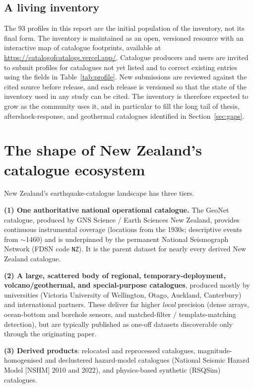 \documentclass[10pt,a4paper]{article}
\newcommand{\inventoryurl}{https://catalogofcatalogs.vercel.app/}
\begin{document}
\subsection{A living inventory}\label{sec:living}
The 93 profiles in this report are the initial population of the inventory, not its final form. The inventory is maintained as an open, versioned resource with an interactive map of catalogue footprints, available at \url{\inventoryurl}. Catalogue producers and users are invited to submit profiles for catalogues not yet listed and to correct existing entries using the fields in Table~\ref{tab:profile}. New submissions are reviewed against the cited source before release, and each release is versioned so that the state of the inventory used in any study can be cited. The inventory is therefore expected to grow as the community uses it, and in particular to fill the long tail of thesis, aftershock-response, and geothermal catalogues identified in Section~\ref{sec:gaps}.

\section{The shape of New Zealand's catalogue ecosystem}\label{sec:overview}
New Zealand's earthquake-catalogue landscape has three tiers.

\textbf{(1) One authoritative national operational catalogue.} The GeoNet catalogue, produced by GNS Science / Earth Sciences New Zealand, provides continuous instrumental coverage (locations from the 1930s; descriptive events from $\sim$1460) and is underpinned by the permanent National Seismograph Network (FDSN code \texttt{NZ}). It is the parent dataset for nearly every derived New Zealand catalogue.

\textbf{(2) A large, scattered body of regional, temporary-deployment, volcano/geothermal, and special-purpose catalogues}, produced mostly by universities (Victoria University of Wellington, Otago, Auckland, Canterbury) and international partners. These deliver far higher \emph{local} precision (dense arrays, ocean-bottom and borehole sensors, and matched-filter / template-matching detection), but are typically published as one-off datasets discoverable only through the originating paper.

\textbf{(3) Derived products}: relocated and reprocessed catalogues, magnitude-homogenised and declustered hazard-model catalogues (National Seismic Hazard Model [NSHM] 2010 and 2022), and physics-based synthetic (RSQSim) catalogues.
\end{document}
